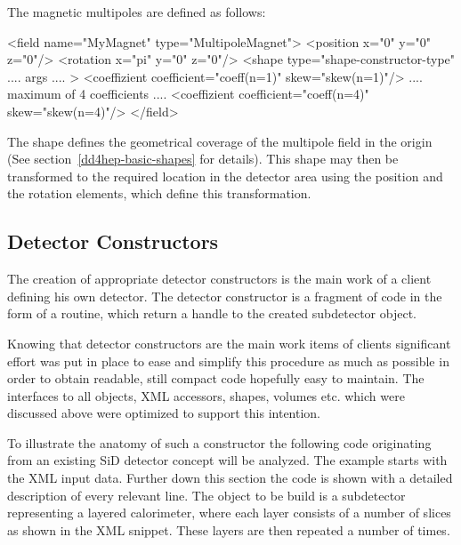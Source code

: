 \documentclass[10pt,a4paper]{article}
\begin{document}
\noindent
The magnetic multipoles are defined as follows:
\begin{code}
  <field name="MyMagnet" type="MultipoleMagnet">
         <position x="0" y="0" z="0"/>
         <rotation x="pi" y="0" z="0"/>
         <shape type="shape-constructor-type" .... args .... >
         <coeffizient coefficient="coeff(n=1)" skew="skew(n=1)"/>
           .... maximum of 4 coefficients ....
         <coeffizient coefficient="coeff(n=4)" skew="skew(n=4)"/>
  </field>
\end{code}
The shape defines the geometrical coverage of the multipole 
field in the origin (See section~\ref{dd4hep-basic-shapes} for details). 
This shape may then be transformed to
the required location in the detector area using the position 
and the rotation elements, which define this transformation.

\newpage
\subsection{Detector Constructors}
\label{sec:dd4hep-manual-detector-constructors}
\noindent
The creation of appropriate detector constructors is the main work of a client
defining his own detector. The detector constructor is a fragment of code in the 
form of a routine, which return a handle to the created subdetector 
 object.

\noindent
Knowing that detector constructors are the main work items of clients significant 
effort was put in place to ease and simplify this procedure as much as possible
in order to obtain readable, still compact code hopefully easy to maintain.
The interfaces to all objects, XML accessors, shapes, volumes etc. which were 
discussed above were optimized to support this intention.

\noindent
To illustrate the anatomy of such a constructor the following code originating
from an existing SiD detector concept will be analyzed. The example starts
with the XML input data. Further down this section the code is shown 
with a detailed description of every relevant line. The object to be build is 
a subdetector representing a layered calorimeter, 
where each layer consists of a number of slices as shown in the XML snippet. 
These layers are then repeated a number of times.
\end{document}
